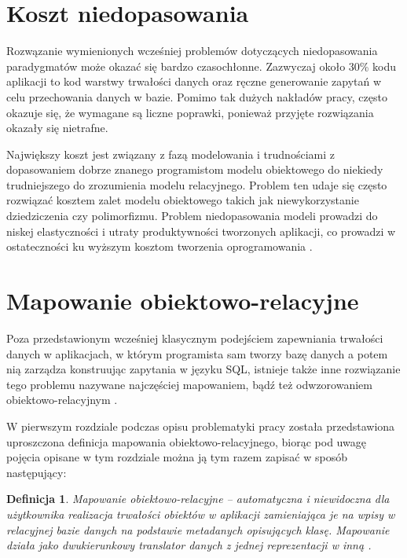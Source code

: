 \documentclass[12pt]{report}
\newtheorem{definition}{Definicja}
\begin{document}
\section{Koszt niedopasowania}

Rozwązanie wymienionych wcześniej problemów dotyczących niedopasowania pa\-radygmatów może okazać się bardzo czasochłonne. Zazwyczaj około 30\% kodu aplikacji
to kod warstwy trwałości danych oraz ręczne generowanie zapytań w celu przechowania danych w bazie. Pomimo tak dużych nakładów pracy, często okazuje się, że
wymagane są liczne poprawki, ponieważ przyjęte rozwiązania okazały się nietrafne.

Największy koszt jest związany z fazą modelowania i trudnościami z dopasowaniem dobrze znanego programistom modelu obiektowego do niekiedy trudniejszego do zrozumienia
modelu relacyjnego. Problem ten udaje się często ro\-związać kosztem zalet modelu obiektowego takich jak niewykorzystanie dziedziczenia czy polimorfizmu. Problem niedopasowania
modeli prowadzi do niskej elastyczności i utraty produktywności tworzonych aplikacji, co prowadzi w ostateczności ku wyższym kosztom tworzenia oprogramowania \cite{hibernate}. 

\section{Mapowanie obiektowo-relacyjne}

Poza przedstawionym wcześniej klasycznym podejściem zapewniania trwałości da\-nych w aplikacjach, w którym programista sam tworzy bazę danych a potem nią zarządza
konstruując zapytania w języku SQL, istnieje także inne rozwiązanie tego problemu nazywane najczęściej mapowaniem, bądź też odwzorowaniem obiektowo-relacyjnym 
\cite{hibernate}.

W pierwszym rozdziale podczas opisu problematyki pracy została przedstawiona uproszczona definicja mapowania obiektowo-relacyjnego, biorąc pod uwagę pojęcia opisane
w tym rozdziale można ją tym razem zapisać w sposób następujący:

\begin{definition}
Mapowanie obiektowo-relacyjne --  automatyczna i niewidoczna dla uży\-tkownika realizacja trwałości obiektów w aplikacji zamieniająca je na wpisy w relacyjnej bazie danych
na podstawie metadanych opisujących klasę. Mapowanie działa jako dwukierunkowy translator danych z jednej reprezentacji w inną \cite{hibernate}. 
\end{definition}
\end{document}
